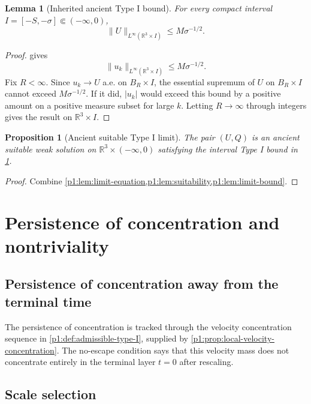 \documentclass[11pt]{amsart}
\theoremstyle{plain}
\newtheorem{lemma}[lemma]{Lemma}
\newtheorem{proposition}[proposition]{Proposition}
\theoremstyle{definition}
\theoremstyle{remark}
\numberwithin{equation}{section}
\newcommand{\R}{\mathbb R}
\begin{document}
\begin{lemma}[Inherited ancient Type I bound]\label{p1:lem:limit-bound}
For every compact interval \(I=[-S,-\sigma]\Subset(-\infty,0)\),
\[
   \|U\|_{L^\infty(\R^3\times I)}\le M\sigma^{-1/2}.
\]
\end{lemma}

\begin{proof}
 gives
\[
   \|u_k\|_{L^\infty(\R^3\times I)}\le M\sigma^{-1/2}.
\]
Fix \(R<\infty\).  Since \(u_k\to U\) a.e. on \(B_R\times I\), the essential
supremum of \(U\) on \(B_R\times I\) cannot exceed \(M\sigma^{-1/2}\).  If it
did, \(|u_k|\) would exceed this bound by a positive amount on a positive
measure subset for large \(k\).  Letting \(R\to\infty\) through integers gives
the result on \(\R^3\times I\).
\end{proof}

\begin{proposition}[Ancient suitable Type I limit]\label{p1:prop:ancient-limit}
The pair \((U,Q)\) is an ancient suitable weak solution on
\(\R^3\times(-\infty,0)\) satisfying the interval Type I bound in
\cref{p1:lem:limit-bound}.
\end{proposition}

\begin{proof}
Combine \cref{p1:lem:limit-equation,p1:lem:suitability,p1:lem:limit-bound}.
\end{proof}

\section{Persistence of concentration and nontriviality}
\label{p1:sec:nontriviality}

\subsection{Persistence of concentration away from the terminal time}

The persistence of concentration is tracked through the velocity concentration sequence in
\cref{p1:def:admissible-type-I}, supplied by
\cref{p1:prop:local-velocity-concentration}.  The no-escape condition says that
this velocity mass does not concentrate entirely in the terminal layer \(t=0\)
after rescaling.

\subsection{Scale selection}
\end{document}
